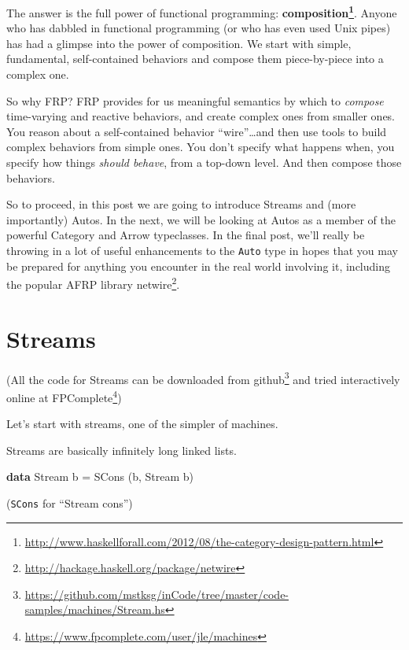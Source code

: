 \documentclass[]{article}
\newenvironment{Shaded}{\begin{snugshade}}{\end{snugshade}}
\newcommand{\DataTypeTok}[1]{\textcolor[rgb]{0.13,0.29,0.53}{#1}}
\newcommand{\FunctionTok}[1]{\textcolor[rgb]{0.00,0.00,0.00}{#1}}
\newcommand{\KeywordTok}[1]{\textcolor[rgb]{0.13,0.29,0.53}{\textbf{#1}}}
\newcommand{\NormalTok}[1]{#1}
\renewcommand{\href}[2]{#2\footnote{\url{#1}}}
\begin{document}
The answer is the full power of functional programming:
\textbf{\href{http://www.haskellforall.com/2012/08/the-category-design-pattern.html}{composition}}.
Anyone who has dabbled in functional programming (or who has even used Unix
pipes) has had a glimpse into the power of composition. We start with simple,
fundamental, self-contained behaviors and compose them piece-by-piece into a
complex one.

So why FRP? FRP provides for us meaningful semantics by which to \emph{compose}
time-varying and reactive behaviors, and create complex ones from smaller ones.
You reason about a self-contained behavior ``wire''\ldots{}and then use tools to
build complex behaviors from simple ones. You don't specify what happens when,
you specify how things \emph{should behave}, from a top-down level. And then
compose those behaviors.

So to proceed, in this post we are going to introduce Streams and (more
importantly) Autos. In the next, we will be looking at Autos as a member of the
powerful Category and Arrow typeclasses. In the final post, we'll really be
throwing in a lot of useful enhancements to the \texttt{Auto} type in hopes that
you may be prepared for anything you encounter in the real world involving it,
including the popular AFRP library
\href{http://hackage.haskell.org/package/netwire}{netwire}.

\hypertarget{streams}{%
\section{Streams}\label{streams}}

(All the code for Streams can be downloaded
\href{https://github.com/mstksg/inCode/tree/master/code-samples/machines/Stream.hs}{from
github} and tried interactively online
\href{https://www.fpcomplete.com/user/jle/machines}{at FPComplete})

Let's start with streams, one of the simpler of machines.

Streams are basically infinitely long linked lists.

\begin{Shaded}
\begin{Highlighting}[]
\KeywordTok{data} \DataTypeTok{Stream}\NormalTok{ b }\FunctionTok{=} \DataTypeTok{SCons}\NormalTok{ (b, }\DataTypeTok{Stream}\NormalTok{ b)}
\end{Highlighting}
\end{Shaded}

(\texttt{SCons} for ``Stream cons'')
\end{document}
